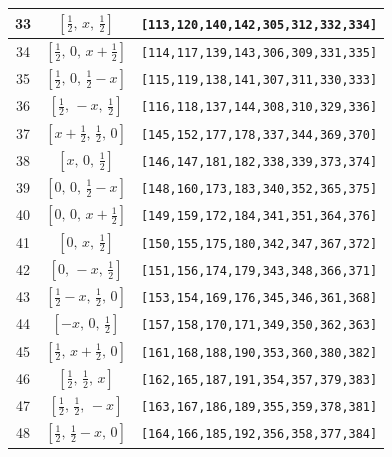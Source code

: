 \documentclass[fleqn,8pt]{jsarticle}
\begin{document}
\begin{longtable}{ccc}
33 & $\left[ \frac{1}{2},\, x,\, \frac{1}{2} \right]$ & {\tt [113,120,140,142,305,312,332,334]} \\ \hline
34 & $\left[ \frac{1}{2},\, 0,\, x + \frac{1}{2} \right]$ & {\tt [114,117,139,143,306,309,331,335]} \\ \hline
35 & $\left[ \frac{1}{2},\, 0,\, \frac{1}{2} - x \right]$ & {\tt [115,119,138,141,307,311,330,333]} \\ \hline
36 & $\left[ \frac{1}{2},\, - x,\, \frac{1}{2} \right]$ & {\tt [116,118,137,144,308,310,329,336]} \\ \hline
37 & $\left[ x + \frac{1}{2},\, \frac{1}{2},\, 0 \right]$ & {\tt [145,152,177,178,337,344,369,370]} \\ \hline
38 & $\left[ x,\, 0,\, \frac{1}{2} \right]$ & {\tt [146,147,181,182,338,339,373,374]} \\ \hline
39 & $\left[ 0,\, 0,\, \frac{1}{2} - x \right]$ & {\tt [148,160,173,183,340,352,365,375]} \\ \hline
40 & $\left[ 0,\, 0,\, x + \frac{1}{2} \right]$ & {\tt [149,159,172,184,341,351,364,376]} \\ \hline
41 & $\left[ 0,\, x,\, \frac{1}{2} \right]$ & {\tt [150,155,175,180,342,347,367,372]} \\ \hline
42 & $\left[ 0,\, - x,\, \frac{1}{2} \right]$ & {\tt [151,156,174,179,343,348,366,371]} \\ \hline
43 & $\left[ \frac{1}{2} - x,\, \frac{1}{2},\, 0 \right]$ & {\tt [153,154,169,176,345,346,361,368]} \\ \hline
44 & $\left[ - x,\, 0,\, \frac{1}{2} \right]$ & {\tt [157,158,170,171,349,350,362,363]} \\ \hline
45 & $\left[ \frac{1}{2},\, x + \frac{1}{2},\, 0 \right]$ & {\tt [161,168,188,190,353,360,380,382]} \\ \hline
46 & $\left[ \frac{1}{2},\, \frac{1}{2},\, x \right]$ & {\tt [162,165,187,191,354,357,379,383]} \\ \hline
47 & $\left[ \frac{1}{2},\, \frac{1}{2},\, - x \right]$ & {\tt [163,167,186,189,355,359,378,381]} \\ \hline
48 & $\left[ \frac{1}{2},\, \frac{1}{2} - x,\, 0 \right]$ & {\tt [164,166,185,192,356,358,377,384]} \\
\end{longtable}
\renewcommand{\arraystretch}{1.2}
\end{document}
